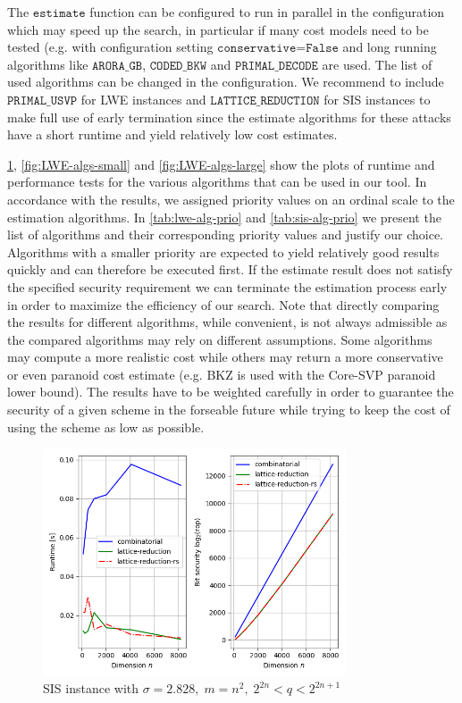 The $\texttt{estimate}$ function can be configured to run in parallel in the configuration which may speed up the search, in particular if many cost models need to be tested (e.g. with configuration setting $\texttt{conservative=False}$ and long running algorithms like $\texttt{ARORA\_GB}$, $\texttt{CODED\_BKW}$ and $\texttt{PRIMAL\_DECODE}$ are used. The list of used algorithms can be changed in the configuration. We recommend to include $\texttt{PRIMAL\_USVP}$ for LWE instances and $\texttt{LATTICE\_REDUCTION}$ for SIS instances to make full use of early termination since the estimate algorithms for these attacks have a short runtime and yield relatively low cost estimates.


\cref{fig:SIS-algs}, \ref{fig:LWE-algs-small} and \ref{fig:LWE-algs-large} show the plots of runtime and performance tests for the various algorithms that can be used in our tool. In accordance with the results, we assigned priority values on an ordinal scale to the estimation algorithms. In \cref{tab:lwe-alg-prio} and \ref{tab:sis-alg-prio} we present the list of algorithms and their corresponding priority values and justify our choice. Algorithms with a smaller priority are expected to yield relatively good results quickly and can therefore be executed first. If the estimate result does not satisfy the specified security requirement we can terminate the estimation process early in order to maximize the efficiency of our search. Note that directly comparing the results for different algorithms, while convenient, is not always admissible as the compared algorithms may rely on different assumptions. Some algorithms may compute a more realistic cost while others may return a more conservative or even paranoid cost estimate (e.g. BKZ is used with the Core-SVP paranoid lower bound). The results have to be weighted carefully in order to guarantee the security of a given scheme in the forseable future while trying to keep the cost of using the scheme as low as possible. %

\begin{figure}[]
    \centering
    \includegraphics[width=0.8\textwidth]{graphics/SIS_stddev=2,828_plots_1s.png}
    \caption{SIS instance with $\sigma=2.828,\; m=n^2, \; 2^{2n} < q < 2^{2n+1}$}\label{fig:SIS-algs}
\end{figure}

